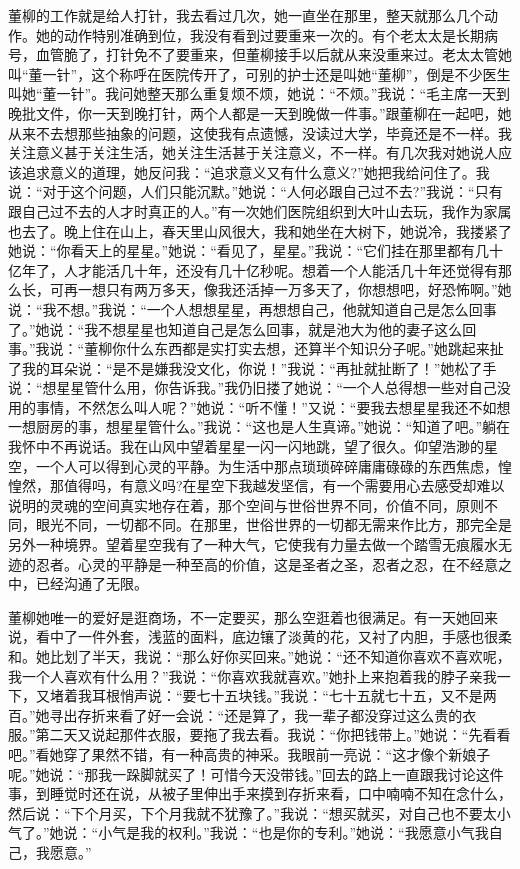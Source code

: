 \documentclass[12pt,oneside]{book}
\begin{document}
董柳的工作就是给人打针，我去看过几次，她一直坐在那里，整天就那么几个动作。她的动作特别准确到位，我没有看到过要重来一次的。有个老太太是长期病号，血管脆了，打针免不了要重来，但董柳接手以后就从来没重来过。老太太管她叫``董一针''，这个称呼在医院传开了，可别的护士还是叫她``董柳''，倒是不少医生叫她``董一针''。我问她整天那么重复烦不烦，她说：``不烦。''我说：``毛主席一天到晚批文件，你一天到晚打针，两个人都是一天到晚做一件事。''跟董柳在一起吧，她从来不去想那些抽象的问题，这使我有点遗憾，没读过大学，毕竟还是不一样。我关注意义甚于关注生活，她关注生活甚于关注意义，不一样。有几次我对她说人应该追求意义的道理，她反问我：``追求意义又有什么意义?''她把我给问住了。我说：``对于这个问题，人们只能沉默。''她说：``人何必跟自己过不去?''我说：``只有跟自己过不去的人才时真正的人。''有一次她们医院组织到大叶山去玩，我作为家属也去了。晚上住在山上，春天里山风很大，我和她坐在大树下，她说冷，我搂紧了她说：``你看天上的星星。''她说：``看见了，星星。''我说：``它们挂在那里都有几十亿年了，人才能活几十年，还没有几十亿秒呢。想着一个人能活几十年还觉得有那么长，可再一想只有两万多天，像我还活掉一万多天了，你想想吧，好恐怖啊。''她说：``我不想。''我说：``一个人想想星星，再想想自己，他就知道自己是怎么回事了。''她说：``我不想星星也知道自己是怎么回事，就是池大为他的妻子这么回事。''我说：``董柳你什么东西都是实打实去想，还算半个知识分子呢。''她跳起来扯了我的耳朵说：``是不是嫌我没文化，你说！''我说：``再扯就扯断了！''她松了手说：``想星星管什么用，你告诉我。''我仍旧搂了她说：``一个人总得想一些对自己没用的事情，不然怎么叫人呢？''她说：``听不懂！''又说：``要我去想星星我还不如想一想厨房的事，想星星管什么。''我说：``这也是人生真谛。''她说：``知道了吧。''躺在我怀中不再说话。我在山风中望着星星一闪一闪地跳，望了很久。仰望浩渺的星空，一个人可以得到心灵的平静。为生活中那点琐琐碎碎庸庸碌碌的东西焦虑，惶惶然，那值得吗，有意义吗?在星空下我越发坚信，有一个需要用心去感受却难以说明的灵魂的空间真实地存在着，那个空间与世俗世界不同，价值不同，原则不同，眼光不同，一切都不同。在那里，世俗世界的一切都无需来作比方，那完全是另外一种境界。望着星空我有了一种大气，它使我有力量去做一个踏雪无痕履水无迹的忍者。心灵的平静是一种至高的价值，这是圣者之圣，忍者之忍，在不经意之中，已经沟通了无限。

董柳她唯一的爱好是逛商场，不一定要买，那么空逛着也很满足。有一天她回来说，看中了一件外套，浅蓝的面料，底边镶了淡黄的花，又衬了内胆，手感也很柔和。她比划了半天，我说：``那么好你买回来。''她说：``还不知道你喜欢不喜欢呢，我一个人喜欢有什么用？''我说：``你喜欢我就喜欢。''她扑上来抱着我的脖子亲我一下，又堵着我耳根悄声说：``要七十五块钱。''我说：``七十五就七十五，又不是两百。''她寻出存折来看了好一会说：``还是算了，我一辈子都没穿过这么贵的衣服。''第二天又说起那件衣服，要拖了我去看。我说：``你把钱带上。''她说：``先看看吧。''看她穿了果然不错，有一种高贵的神采。我眼前一亮说：``这才像个新娘子呢。''她说：``那我一跺脚就买了！可惜今天没带钱。''回去的路上一直跟我讨论这件事，到睡觉时还在说，从被子里伸出手来摸到存折来看，口中喃喃不知在念什么，然后说：``下个月买，下个月我就不犹豫了。''我说：``想买就买，对自己也不要太小气了。''她说：``小气是我的权利。''我说：``也是你的专利。''她说：``我愿意小气我自己，我愿意。''
\end{document}
